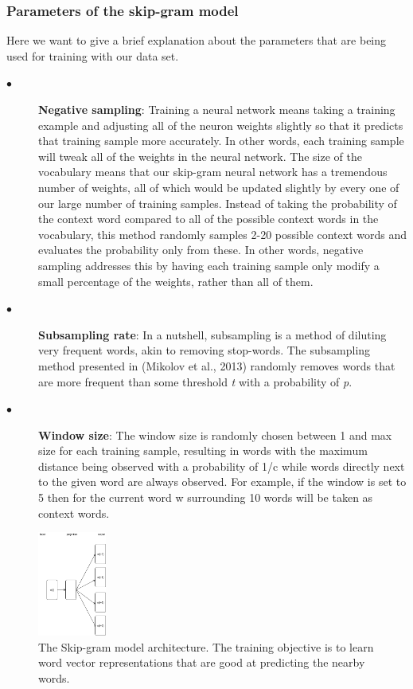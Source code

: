 \subsubsection{ Parameters of the skip-gram model}
Here we want to give a brief explanation about the parameters that are being used for training with our data set.
\begin{description}
	\item [$\bullet$] \textbf{Negative sampling}: Training a neural network means taking a training example and adjusting all of the neuron weights slightly so that it predicts that training sample more accurately. In other words, each training sample will tweak all of the weights in the neural network. The size of the vocabulary means that our skip-gram neural network has a tremendous number of weights, all of which would be updated slightly by every one of our large number of training samples. Instead of taking the probability of the context word compared to all of the possible context words in the vocabulary, this method randomly samples 2-20 possible context words and evaluates the probability only from these. In other words, negative sampling addresses this by having each training sample only modify a small percentage of the weights, rather than all of them.
	
	\item [$\bullet$] \textbf{Subsampling rate}: In a nutshell, subsampling is a method of diluting very frequent words, akin to removing stop-words. The subsampling method presented in (Mikolov et al., 2013) \cite{mikolov2013distributed} randomly removes words that are more frequent than some threshold \textit{t} with a probability of \textit{p}.
	
	\item [$\bullet$] \textbf{Window size}: The window size is randomly chosen between 1 and max size for each training sample, resulting in words with the maximum distance being observed with a probability of 1/c while words directly next to the given word are always observed. For example, if the window is set to 5 then for the current word w surrounding 10 words will be taken as context words.
	
\end{description}

\begin{figure}[t!]
	
	\includegraphics[width=0.20\textwidth]{skipgram}
	\caption{The Skip-gram model architecture. The training objective is to learn word vector representations that are good at predicting the nearby words.}
	\label{fig:clf}
\end{figure}


